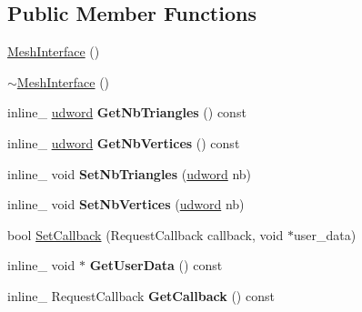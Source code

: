 \subsection*{Public Member Functions}
\begin{DoxyCompactItemize}
\item 
\hyperlink{classOpcode_1_1MeshInterface_aba590ec6ec5432322174b1450745f808}{Mesh\+Interface} ()
\item 
\hyperlink{classOpcode_1_1MeshInterface_abb1a0da3ced5e305f059d66b289a1f85}{$\sim$\+Mesh\+Interface} ()
\item 
inline\+\_\+ \hyperlink{IceTypes_8h_a44c6f1920ba5551225fb534f9d1a1733}{udword} {\bfseries Get\+Nb\+Triangles} () const \hypertarget{classOpcode_1_1MeshInterface_a23527784fa1a47b9d6616ba26b9e11c6}{}\label{classOpcode_1_1MeshInterface_a23527784fa1a47b9d6616ba26b9e11c6}

\item 
inline\+\_\+ \hyperlink{IceTypes_8h_a44c6f1920ba5551225fb534f9d1a1733}{udword} {\bfseries Get\+Nb\+Vertices} () const \hypertarget{classOpcode_1_1MeshInterface_ad28dd32ec1a81aaef187bd6bdfb93596}{}\label{classOpcode_1_1MeshInterface_ad28dd32ec1a81aaef187bd6bdfb93596}

\item 
inline\+\_\+ void {\bfseries Set\+Nb\+Triangles} (\hyperlink{IceTypes_8h_a44c6f1920ba5551225fb534f9d1a1733}{udword} nb)\hypertarget{classOpcode_1_1MeshInterface_aeca8af2c1f71da2dc455a4ced7d9da74}{}\label{classOpcode_1_1MeshInterface_aeca8af2c1f71da2dc455a4ced7d9da74}

\item 
inline\+\_\+ void {\bfseries Set\+Nb\+Vertices} (\hyperlink{IceTypes_8h_a44c6f1920ba5551225fb534f9d1a1733}{udword} nb)\hypertarget{classOpcode_1_1MeshInterface_a48eec38993e540f2bef7cd15416ac1c0}{}\label{classOpcode_1_1MeshInterface_a48eec38993e540f2bef7cd15416ac1c0}

\item 
bool \hyperlink{classOpcode_1_1MeshInterface_af21a0ce88197f843e178349289f0b335}{Set\+Callback} (Request\+Callback callback, void $\ast$user\+\_\+data)
\item 
inline\+\_\+ void $\ast$ {\bfseries Get\+User\+Data} () const \hypertarget{classOpcode_1_1MeshInterface_aed086ab8ebb179be61e25f755766955f}{}\label{classOpcode_1_1MeshInterface_aed086ab8ebb179be61e25f755766955f}

\item 
inline\+\_\+ Request\+Callback {\bfseries Get\+Callback} () const \hypertarget{classOpcode_1_1MeshInterface_a5cb1bd40e16779b42f34e9f7ffad1ed1}{}\label{classOpcode_1_1MeshInterface_a5cb1bd40e16779b42f34e9f7ffad1ed1}


\end{DoxyCompactItemize}
